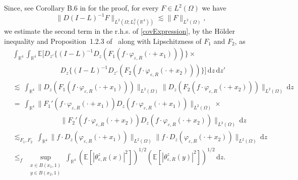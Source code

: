 \documentclass{article}
\newcommand{\mathd}{\mathrm{d}}
\begin{document}
%
Since, see Corollary B.6 in {\cite{FG2019}} for the proof, for every $F \in
L^2 (\Omega)$ we have
\begin{equation}
  \| D (I - L)^{- 1} F \|_{L^2 (\Omega ; L_{\ell}^2 (\mathbb{R}^4))} \lesssim
  \| F \|_{L^2 (\Omega)}, \label{corB.6}
\end{equation}
we estimate the second term in the r.h.s. of \eqref{covExpression}, by the H{\"o}lder inequality and Proposition~1.2.3 of~{\cite{Nualart2006}} along with Lipschitzness of $F_1$ and $F_2$, as 
%
\begin{align}
		& \int_{\mathbb{R}^4} \int_{\mathbb{R}^4} \mathbb{E} \big[D_{z'} \{ (I -
		L)^{- 1} D_z  (F_1 (f \cdot \varphi_{\varepsilon, R} (\cdot + x_1))) \} \times \nonumber \\
		& \qquad \hspace{2cm}
		D_z \{ (I - L)^{- 1} D_{z'}  (F_2 (f \cdot \varphi_{\varepsilon, R} (\cdot
		+ x_2))) \} \big] \, \mathd z \, \mathd z' \nonumber \\
		& \lesssim  ~ \int_{\mathbb{R}^4} \| D_z (F_1 (f \cdot \varphi_{\varepsilon,
			R} (\cdot + x_1))) \|_{L^2 (\Omega)} \| D_z (F_2 (f \cdot
		\varphi_{\varepsilon, R} (\cdot + x_2))) \|_{L^2 (\Omega)} \, \mathd z \nonumber \\
		& = ~  \int_{\mathbb{R}^4} \| F_1' (f \cdot \varphi_{\varepsilon, R} (\cdot +
		x_1)) D_z (f \cdot \varphi_{\varepsilon, R} (\cdot + x_1)) \|_{L^2
			(\Omega)} \times  \nonumber \\
		& \qquad  \hspace{2cm}\| F_2' (f \cdot \varphi_{\varepsilon, R} (\cdot + x_2)) D_z (f
		\cdot \varphi_{\varepsilon, R} (\cdot + x_2)) \|_{L^2 (\Omega)} \, \mathd z \nonumber \\
		& \lesssim_{F_1, F_2} ~ \int_{\mathbb{R}^4} \| f \cdot D_z
		(\varphi_{\varepsilon, R} (\cdot + x_1)) \|_{L^2 (\Omega)} \| f \cdot D_z
		(\varphi_{\varepsilon, R} (\cdot + x_2)) \|_{L^2 (\Omega)} \, \mathd z \nonumber \\
		& \leq_f ~ \sup_{\substack{x \in B (x_1, 1) \\ y \in B (x_2, 1)}}
		\int_{\mathbb{R}^4} \left(\mathbb{E} \left[| \theta_{\varepsilon, R}^z (x) |^2 \right]\right)^{1 /
			2} \left(\mathbb{E} \left[| \theta_{\varepsilon, R}^z (y) |^2 \right]\right)^{1 /
			2} \,  \mathd z.
	\label{rhs2Est}
\end{align}
\end{document}
